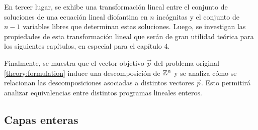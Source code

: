 En tercer lugar, se exhibe una transformación lineal entre el conjunto de soluciones de una ecuación
lineal diofantina en $n$ incógnitas y el conjunto de $n - 1$ variables libres que determinan estas
soluciones. Luego, se investigan las propiedades de esta transformación lineal que serán de gran utilidad
teórica para los siguientes capítulos, en especial para el capítulo 4.

Finalmente, se muestra que el vector objetivo $\vec{p}$ del problema original
\eqref{theory:formulation} induce una descomposición de $\mathbb{Z}^n$ y se analiza cómo se relacionan las
descomposiciones asociadas a distintos vectores $\vec{p}$. Esto permitirá analizar equivalencias
entre distintos programas lineales enteros.

\subsection{Capas enteras}
\label{subsec:sym}

